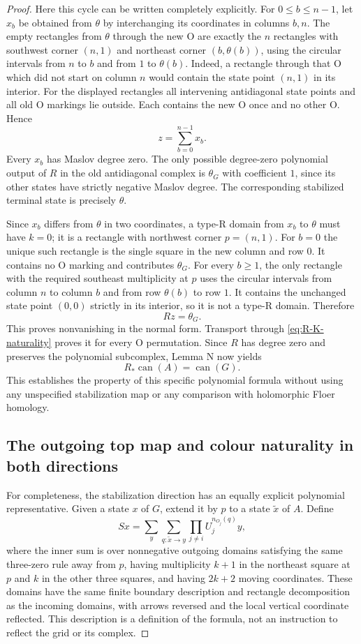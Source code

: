 \documentclass[11pt,a4paper]{article}
\theoremstyle{remark}
\begin{document}
\begin{proof}
Here this cycle can be written completely explicitly.  For
$0\le b\le n-1$, let $x_b$ be obtained from $\theta$ by interchanging
its coordinates in columns $b,n$.  The empty rectangles from
$\theta$ through the new O are exactly the $n$ rectangles with
southwest corner $(n,1)$ and northeast corner $(b,\theta(b))$,
using the circular intervals from $n$ to $b$ and from $1$ to
$\theta(b)$.  Indeed, a rectangle through that O which did not start
on column $n$ would contain the state point $(n,1)$ in its interior.
For the displayed rectangles all intervening antidiagonal state
points and all old O markings lie outside.  Each contains the new
O once and no other O.  Hence
\[
 z=\sum_{b=0}^{n-1}x_b.
\]
Every $x_b$ has Maslov degree zero.  The only possible degree-zero
polynomial output of $R$ in the old antidiagonal complex is
$\theta_G$ with coefficient $1$, since its other states have strictly
negative Maslov degree.  The corresponding stabilized terminal state
is precisely $\theta$.

Since $x_b$ differs from $\theta$ in two coordinates, a type-R domain
from $x_b$ to $\theta$ must have $k=0$; it is a rectangle with
northwest corner $p=(n,1)$.  For $b=0$ the unique such rectangle is
the single square in the new column and row $0$.  It contains no O
marking and contributes $\theta_G$.  For every $b\ge1$, the only
rectangle with the required southeast multiplicity at $p$ uses the
circular intervals from column $n$ to column $b$ and from row
$\theta(b)$ to row $1$.  It contains the unchanged state point
$(0,0)$ strictly in its interior, so it is not a type-R domain.
Therefore
\[
 Rz=\theta_G.
\]
This proves nonvanishing in the normal form.  Transport through
\eqref{eq:R-K-naturality} proves it for every O permutation.  Since
$R$ has degree zero and preserves the polynomial subcomplex, Lemma N
now yields
\begin{equation}\label{eq:R-canonical-independent}
 R_*\operatorname{can}(A)=\operatorname{can}(G).
\end{equation}
This establishes the property of this specific polynomial formula
without using any unspecified stabilization map or any comparison
with holomorphic Floer homology.

\subsection{The outgoing top map and colour naturality in both directions}

For completeness, the stabilization direction has an equally explicit
polynomial representative.  Given a state $x$ of $G$, extend it by $p$
to a state $\widetilde x$ of $A$.  Define
\[
 Sx=\sum_y\sum_{q:\widetilde x\to y}
       \prod_{j\ne i}U_j^{n_{O_j}(q)}y,
\]
where the inner sum is over nonnegative outgoing domains satisfying
the same three-zero rule away from $p$, having multiplicity $k+1$
in the northeast square at $p$ and $k$ in the other three squares,
and having $2k+2$ moving coordinates.  These domains have the same
finite boundary description and rectangle decomposition as the
incoming domains, with arrows reversed and the local vertical
coordinate reflected.  This description is a definition of the
formula, not an instruction to reflect the grid or its complex.


\end{proof}
\end{document}
